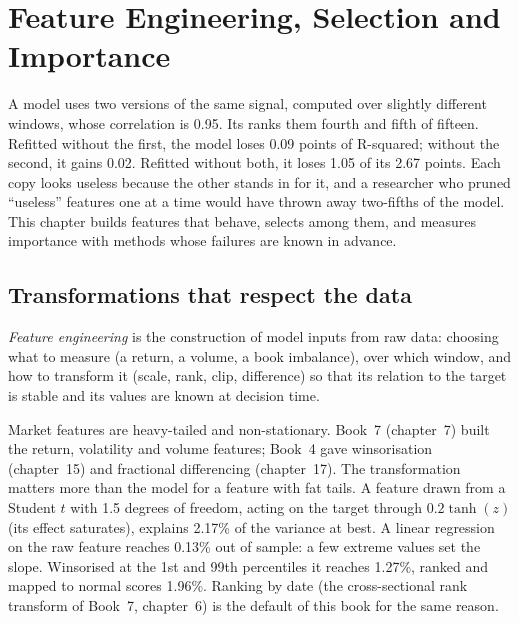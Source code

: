 \chapter{Feature Engineering, Selection and Importance}\label{ch:ml:feature-engineering-selection-and-importance}

A model uses two versions of the same signal, computed over slightly different windows, whose correlation is 0.95. Its
 ranks them fourth and fifth of fifteen. Refitted without the first, the model loses 0.09 points
of R-squared; without the second, it gains 0.02. Refitted without both, it loses 1.05 of its 2.67 points. Each copy looks
useless because the other stands in for it, and a researcher who pruned ``useless'' features one at a time would have
thrown away two-fifths of the model. This chapter builds features that behave, selects among them, and measures
importance with methods whose failures are known in advance.

\section{Transformations that respect the data}

\begin{definition}\label{def:ml:feature-engineering-selection-and-importance:engineering}
\emph{Feature engineering} is the construction of model inputs from raw data: choosing what
to measure (a return, a volume, a book imbalance), over which window, and how to transform it (scale, rank, clip,
difference) so that its relation to the target is stable and its values are known at decision time.
\end{definition}

Market features are heavy-tailed and non-stationary. Book~7 (chapter~7) built the return, volatility and volume
features; Book~4 gave winsorisation (chapter~15) and fractional differencing (chapter~17). The transformation matters
more than the model for a feature with fat tails. A feature drawn from a Student $t$ with 1.5 degrees of freedom,
acting on the target through $0.2\tanh(z)$ (its effect saturates), explains 2.17\% of the variance at best. A linear
regression on the raw feature reaches 0.13\% out of sample: a few extreme values set the slope. Winsorised at the 1st
and 99th percentiles it reaches 1.27\%, ranked and mapped to normal scores 1.96\%. Ranking by date (the cross-sectional
rank transform of Book~7, chapter~6) is the default of this book for the same reason.

